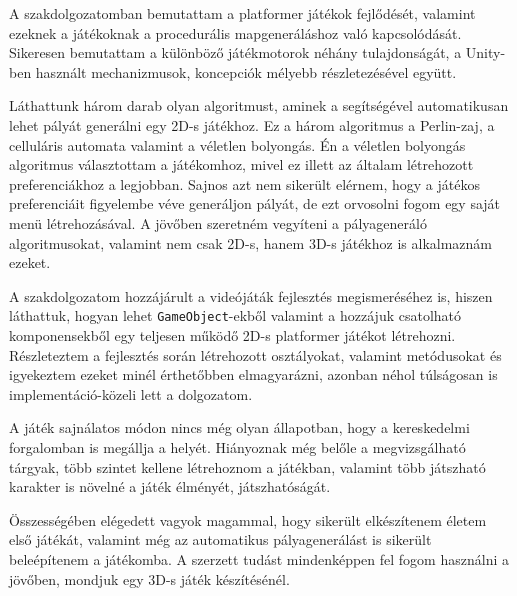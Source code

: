 
A szakdolgozatomban bemutattam a platformer játékok fejlődését, valamint ezeknek a játékoknak a procedurális mapgeneráláshoz való kapcsolódását. Sikeresen bemutattam a különböző játékmotorok néhány tulajdonságát, a Unity-ben használt mechanizmusok, koncepciók mélyebb részletezésével együtt. 

Láthattunk három darab olyan algoritmust, aminek a segítségével automatikusan lehet pályát generálni egy 2D-s játékhoz. Ez a három algoritmus a Perlin-zaj, a celluláris automata valamint a véletlen bolyongás. Én a véletlen bolyongás algoritmus választottam a játékomhoz, mivel ez illett az általam létrehozott preferenciákhoz a legjobban. Sajnos azt nem sikerült elérnem, hogy a játékos preferenciáit figyelembe véve generáljon pályát, de ezt orvosolni fogom egy saját menü létrehozásával. A jövőben szeretném vegyíteni a pályageneráló algoritmusokat, valamint nem csak 2D-s, hanem 3D-s játékhoz is alkalmaznám ezeket.

A szakdolgozatom hozzájárult a videójáták fejlesztés megismeréséhez is, hiszen láthattuk, hogyan lehet \texttt{GameObject}-ekből valamint a hozzájuk csatolható komponensekből egy teljesen működő 2D-s platformer játékot létrehozni. Részleteztem a fejlesztés során létrehozott osztályokat, valamint metódusokat és igyekeztem ezeket minél érthetőbben elmagyarázni, azonban néhol túlságosan is implementáció-közeli lett a dolgozatom.

A játék sajnálatos módon nincs még olyan állapotban, hogy a kereskedelmi forgalomban is megállja a helyét. Hiányoznak még belőle a megvizsgálható tárgyak, több szintet kellene létrehoznom a játékban, valamint több játszható karakter is növelné a játék élményét, játszhatóságát.

Összességében elégedett vagyok magammal, hogy sikerült elkészítenem életem első játékát, valamint még az automatikus pályagenerálást is sikerült beleépítenem a játékomba. A szerzett tudást mindenképpen fel fogom használni a jövőben, mondjuk egy 3D-s játék készítésénél.